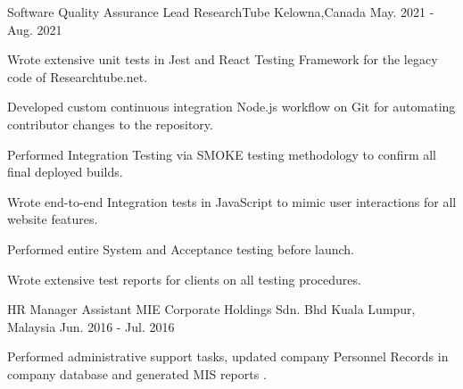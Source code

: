 
\vspace{-1ex}
\begin{cventries}

  \cventry
    {Software Quality Assurance Lead} %
    {ResearchTube} %
    {Kelowna,Canada} %
    {May. 2021 - Aug. 2021} %
    {
      \begin{cvitems} %
                \item {Wrote extensive unit tests in Jest and React Testing Framework for the legacy code of Researchtube.net.}
        \item {Developed custom continuous integration Node.js workflow on Git for automating contributor changes to the repository.}
        \item {Performed Integration Testing via SMOKE testing methodology to confirm all final deployed builds.}
        \item {Wrote end-to-end Integration tests in JavaScript to mimic user interactions for all website features.}
        \item { Performed entire System and Acceptance testing before launch.}
        \item { Wrote extensive test reports for clients on all testing procedures.}
      \end{cvitems}
    }

  \cventry
     {HR Manager Assistant} %
    {MIE Corporate Holdings Sdn. Bhd} %
    {Kuala Lumpur, Malaysia} %
    {Jun. 2016 - Jul. 2016} %
    {
      \begin{cvitems} %
        \item {Performed administrative support tasks, updated company Personnel Records in company database and generated MIS reports .}
      \end{cvitems}
    }


 



\vspace{-3ex}
\end{cventries}
